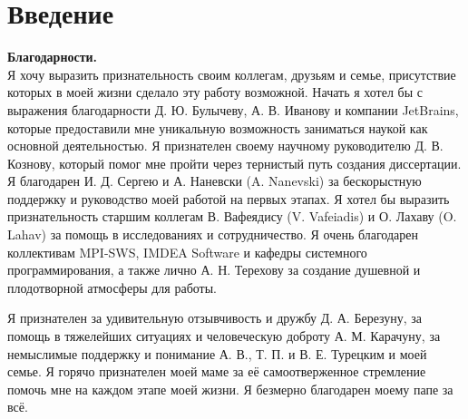 \chapter*{Введение}							%

\newcommand{\actuality}{{\textbf{\actualityTXT}}}
\newcommand{\progress}{\textbf{\progressTXT}}
\newcommand{\aim}{{\textbf\aimTXT}}
\newcommand{\tasks}{\textbf{\tasksTXT}}
\newcommand{\novelty}{\textbf{\noveltyTXT}}
\newcommand{\influence}{\textbf{\influenceTXT}}
\newcommand{\methods}{\textbf{\methodsTXT}}
\newcommand{\defpositions}{\textbf{\defpositionsTXT}}
\newcommand{\reliability}{\textbf{\reliabilityTXT}}
\newcommand{\probation}{\textbf{\probationTXT}}
\newcommand{\contribution}{\textbf{\contributionTXT}}
\newcommand{\publications}{\textbf{\publicationsTXT}}

\newcommand{\ccite}[1]{\cite{#1}}
\newcommand{\cscite}[1]{~\cite{#1}}


\textbf{Благодарности.} \\
Я хочу выразить признательность своим коллегам, друзьям и семье, присутствие которых
в моей жизни сделало эту работу возможной.
Начать я хотел бы с выражения благодарности Д. Ю. Булычеву, А. В. Иванову и компании JetBrains,
которые предоставили мне уникальную возможность заниматься наукой как основной деятельностью.
Я признателен своему научному руководителю Д. В. Кознову, который помог мне пройти через тернистый путь
создания диссертации. 
Я благодарен И. Д. Сергею и А. Наневски (A. Nanevski) за бескорыстную поддержку и руководство
моей работой на первых этапах.
Я хотел бы выразить признательность старшим коллегам В. Вафеядису (V. Vafeiadis) и О. Лахаву (O. Lahav)
за помощь в исследованиях и сотрудничество.
Я очень благодарен коллективам MPI-SWS, IMDEA Software и кафедры системного программирования,
а также лично А. Н. Терехову за создание душевной и плодотворной атмосферы для работы.

Я признателен за удивительную отзывчивость и дружбу Д. А. Березуну,
за помощь в тяжелейших ситуациях и человеческую доброту А. М. Карачуну,
за немыслимые поддержку и понимание А. В., Т. П. и В. Е. Турецким и моей семье.
Я горячо признателен моей маме за её самоотверженное стремление помочь мне на каждом этапе моей жизни.
Я безмерно благодарен моему папе за всё.
